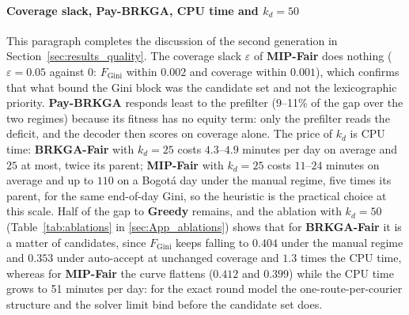 \documentclass[a4paper,11pt,review,3p,authoryear]{elsarticle}
\newcommand{\FG}{F_{\text{Gini}}}
\begin{document}
\paragraph{Coverage slack, \textbf{Pay-BRKGA}, CPU time and $k_d = 50$} This paragraph completes the discussion of the second generation in Section~\ref{sec:results_quality}. The coverage slack $\varepsilon$ of \textbf{MIP-Fair} does nothing ($\varepsilon = 0.05$ against $0$: $\FG$ within $0.002$ and coverage within $0.001$), which confirms that what bound the Gini block was the candidate set and not the lexicographic priority. \textbf{Pay-BRKGA} responds least to the prefilter (9--11\% of the gap over the two regimes) because its fitness has no equity term: only the prefilter reads the deficit, and the decoder then scores on coverage alone. The price of $k_d$ is CPU time: \textbf{BRKGA-Fair} with $k_d = 25$ costs $4.3$--$4.9$ minutes per day on average and $25$ at most, twice its parent; \textbf{MIP-Fair} with $k_d = 25$ costs $11$--$24$ minutes on average and up to $110$ on a Bogot\'a day under the manual regime, five times its parent, for the same end-of-day Gini, so the heuristic is the practical choice at this scale. Half of the gap to \textbf{Greedy} remains, and the ablation with $k_d = 50$ (Table~\ref{tab:ablations} in \ref{sec:App_ablations}) shows that for \textbf{BRKGA-Fair} it is a matter of candidates, since $\FG$ keeps falling to $0.404$ under the manual regime and $0.353$ under auto-accept at unchanged coverage and $1.3$ times the CPU time, whereas for \textbf{MIP-Fair} the curve flattens ($0.412$ and $0.399$) while the CPU time grows to 51 minutes per day: for the exact round model the one-route-per-courier structure and the solver limit bind before the candidate set does.
\end{document}
